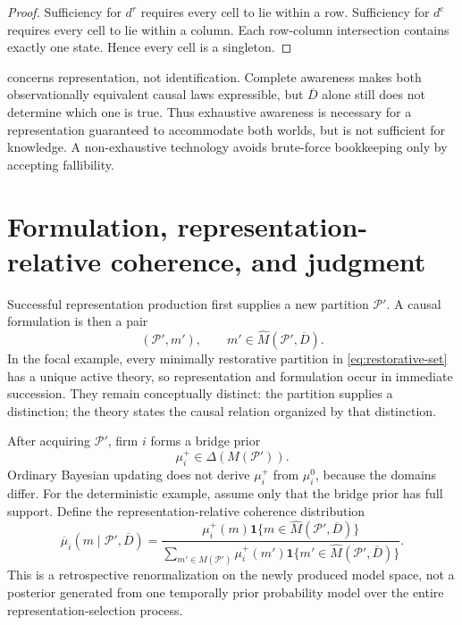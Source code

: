 \documentclass[11pt]{article}
\newcommand{\ind}{\mathbf 1}
\begin{document}
\begin{proof}
Sufficiency for $d^r$ requires every cell to lie within a row.  Sufficiency for
$d^c$ requires every cell to lie within a column.  Each row-column intersection
contains exactly one state.  Hence every cell is a singleton.
\end{proof}

 concerns representation, not identification.
Complete awareness makes both observationally equivalent causal laws
expressible, but $\overline D$ alone still does not determine which one is true.
Thus exhaustive awareness is necessary for a representation guaranteed to
accommodate both worlds, but is not sufficient for knowledge.  A non-exhaustive
technology avoids brute-force bookkeeping only by accepting fallibility.

\section{Formulation, representation-relative coherence, and judgment}

Successful representation production first supplies a new partition
$\mathcal P'$.  A causal formulation is then a pair
\[
(\mathcal P',m'),
\qquad
m'\in\widehat M(\mathcal P',\overline D).
\]
In the focal example, every minimally restorative partition in
\cref{eq:restorative-set} has a unique active theory, so representation and
formulation occur in immediate succession.  They remain conceptually distinct:
the partition supplies a distinction; the theory states the causal relation
organized by that distinction.

After acquiring $\mathcal P'$, firm $i$ forms a bridge prior
\begin{equation}
\mu_i^+\in\Delta(M(\mathcal P')).
\label{eq:bridge-prior}
\end{equation}
Ordinary Bayesian updating does not derive $\mu_i^+$ from $\mu_i^0$, because
the domains differ.  For the deterministic example, assume only that the bridge
prior has full support.  Define the representation-relative coherence
distribution
\begin{equation}
\overline\mu_i(m\mid\mathcal P',\overline D)
=
\frac{
\mu_i^+(m)\ind\{m\in\widehat M(\mathcal P',\overline D)\}
}{
\sum_{m'\in M(\mathcal P')}
\mu_i^+(m')\ind\{m'\in\widehat M(\mathcal P',\overline D)\}
}.
\label{eq:coherence-distribution}
\end{equation}
This is a retrospective renormalization on the newly produced model space, not
a posterior generated from one temporally prior probability model over the
entire representation-selection process.
\end{document}
